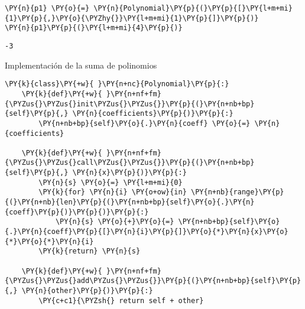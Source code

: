 \begin{example}
\begin{tcolorbox}[breakable, size=fbox, boxrule=1pt, pad at break*=1mm,colback=cellbackground, colframe=cellborder]
\begin{Verbatim}[commandchars=\\\{\}]
\PY{n}{p1} \PY{o}{=} \PY{n}{Polynomial}\PY{p}{(}\PY{p}{[}\PY{l+m+mi}{1}\PY{p}{,}\PY{o}{\PYZhy{}}\PY{l+m+mi}{1}\PY{p}{]}\PY{p}{)}
\PY{n}{p1}\PY{p}{(}\PY{l+m+mi}{4}\PY{p}{)}
\end{Verbatim}
\end{tcolorbox}

\begin{tcolorbox}[breakable, size=fbox, boxrule=.5pt, pad at break*=1mm, opacityfill=0]
\begin{Verbatim}[commandchars=\\\{\}]
-3
\end{Verbatim}
\end{tcolorbox}
        
Implementación de la suma de polinomios

\begin{tcolorbox}[breakable, size=fbox, boxrule=1pt, pad at break*=1mm,colback=cellbackground, colframe=cellborder]
\begin{Verbatim}[commandchars=\\\{\}]
\PY{k}{class}\PY{+w}{ }\PY{n+nc}{Polynomial}\PY{p}{:}
    \PY{k}{def}\PY{+w}{ }\PY{n+nf+fm}{\PYZus{}\PYZus{}init\PYZus{}\PYZus{}}\PY{p}{(}\PY{n+nb+bp}{self}\PY{p}{,} \PY{n}{coefficients}\PY{p}{)}\PY{p}{:}
        \PY{n+nb+bp}{self}\PY{o}{.}\PY{n}{coeff} \PY{o}{=} \PY{n}{coefficients}

    \PY{k}{def}\PY{+w}{ }\PY{n+nf+fm}{\PYZus{}\PYZus{}call\PYZus{}\PYZus{}}\PY{p}{(}\PY{n+nb+bp}{self}\PY{p}{,} \PY{n}{x}\PY{p}{)}\PY{p}{:}
        \PY{n}{s} \PY{o}{=} \PY{l+m+mi}{0}
        \PY{k}{for} \PY{n}{i} \PY{o+ow}{in} \PY{n+nb}{range}\PY{p}{(}\PY{n+nb}{len}\PY{p}{(}\PY{n+nb+bp}{self}\PY{o}{.}\PY{n}{coeff}\PY{p}{)}\PY{p}{)}\PY{p}{:}
            \PY{n}{s} \PY{o}{+}\PY{o}{=} \PY{n+nb+bp}{self}\PY{o}{.}\PY{n}{coeff}\PY{p}{[}\PY{n}{i}\PY{p}{]}\PY{o}{*}\PY{n}{x}\PY{o}{*}\PY{o}{*}\PY{n}{i}
        \PY{k}{return} \PY{n}{s}
    
    \PY{k}{def}\PY{+w}{ }\PY{n+nf+fm}{\PYZus{}\PYZus{}add\PYZus{}\PYZus{}}\PY{p}{(}\PY{n+nb+bp}{self}\PY{p}{,} \PY{n}{other}\PY{p}{)}\PY{p}{:}
        \PY{c+c1}{\PYZsh{} return self + other}


\end{Verbatim}
\end{tcolorbox}
\end{example}
